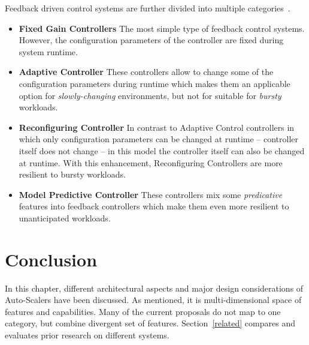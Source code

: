 Feedback driven control systems are further divided into multiple categories~\cite{Patikirikorala:2018}.
\begin{itemize}
    \item \textbf{Fixed Gain Controllers} The most simple type of feedback control systems. However, the configuration parameters of the controller are fixed during system runtime.
    \item \textbf{Adaptive Controller} These controllers allow to change some of the configuration parameters during runtime which makes them an applicable option for \emph{slowly-changing} environments, but not for suitable for \emph{bursty} workloads.
    \item \textbf{Reconfiguring Controller} In contrast to Adaptive Control controllers in which only configuration parameters can be changed at runtime -- controller itself does not change -- in this model the controller itself can also be changed at runtime. With this enhancement, Reconfiguring Controllers are more resilient to bursty workloads.
    \item \textbf{Model Predictive Controller} These controllers mix some \emph{predicative} features into feedback controllers which make them even more resilient to unanticipated workloads.
\end{itemize}

\section{Conclusion}
\label{ias:conc}

In this chapter, different architectural aspects and major design considerations of Auto-Scalers have been discussed. As mentioned, it is multi-dimensional space of features and capabilities. Many of the current proposals do not map to one category, but combine divergent set of features. Section~\ref{related} compares and evaluates prior research on different systems.